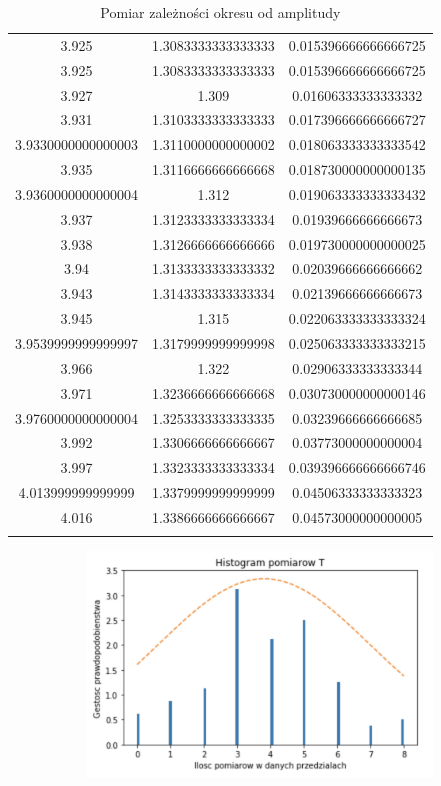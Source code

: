 \documentclass[a4paper,12pt]{article}
\begin{document}
\begin{justify}
\begin{scriptsize}
\begin{longtable}{|c|c|c|}
3.925 & 1.3083333333333333 & 0.015396666666666725 \\
3.925 & 1.3083333333333333 & 0.015396666666666725 \\
3.927 & 1.309 & 0.01606333333333332 \\
3.931 & 1.3103333333333333 & 0.017396666666666727 \\
3.9330000000000003 & 1.3110000000000002 & 0.018063333333333542 \\
3.935 & 1.3116666666666668 & 0.018730000000000135 \\
3.9360000000000004 & 1.312 & 0.019063333333333432 \\
3.937 & 1.3123333333333334 & 0.01939666666666673 \\
3.938 & 1.3126666666666666 & 0.019730000000000025 \\
3.94 & 1.3133333333333332 & 0.02039666666666662 \\
3.943 & 1.3143333333333334 & 0.02139666666666673 \\
3.945 & 1.315 & 0.022063333333333324 \\
3.9539999999999997 & 1.3179999999999998 & 0.025063333333333215 \\
3.966 & 1.322 & 0.02906333333333344 \\
3.971 & 1.3236666666666668 & 0.030730000000000146 \\
3.9760000000000004 & 1.3253333333333335 & 0.03239666666666685 \\
3.992 & 1.3306666666666667 & 0.03773000000000004 \\
3.997 & 1.3323333333333334 & 0.039396666666666746 \\
4.013999999999999 & 1.3379999999999999 & 0.04506333333333323 \\
4.016 & 1.3386666666666667 & 0.04573000000000005 \\
\hline
\caption{Pomiar zależności okresu od amplitudy }
\end{longtable}
\end{scriptsize}

\begin{figure}[h]
\centering
\includegraphics[width=12cm, height=6cm]{gauss}
\end{figure}


\end{justify}
\end{document}
